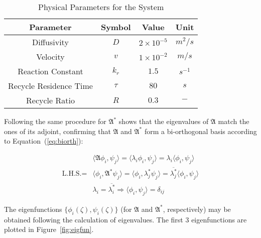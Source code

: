 \begin{table}[ht]
    \centering
    \caption{Physical Parameters for the System}
    \label{tab:pars}
    \begin{tabular}{|c|c|c|c|}
    \hline
    \textbf{Parameter}        & \textbf{Symbol} & \textbf{Value}     & \textbf{Unit}    \\ \hline
    Diffusivity               & $D$             & $2\times10^{-5}$   & ${m^2}/{s}$      \\ \hline
    Velocity                  & $v$             & $1\times10^{-2}$   & ${m}/{s}$        \\ \hline
    Reaction Constant         & $k_r$           & $1.5$              & $s^{-1}$         \\ \hline
    Recycle Residence Time    & $\tau$          & $80$               & $s$              \\ \hline
    Recycle Ratio             & $R$             & $0.3$              & $-$              \\ \hline
    \end{tabular}
\end{table}

Following the same procedure for $\mathfrak{A}^*$ shows that the eigenvalues of $\mathfrak{A}$ match the ones of its adjoint, confirming that $\mathfrak{A}$ and $\mathfrak{A}^*$ form a bi-orthogonal basis according to Equation~(\ref{eq:biorth}):

\begin{equation} \label{eq:biorth}
    \begin{aligned}
        &\langle \mathfrak{A} \phi_i, \psi_j \rangle = \langle \lambda_i \phi_i, \psi_j \rangle = \lambda_i \langle \phi_i, \psi_j \rangle \\
        \text{L.H.S.} = &\langle \phi_i, \mathfrak{A}^* \psi_j \rangle = \langle \phi_i, \lambda_j^* \psi_j \rangle = \overline{\lambda_j^*} \langle \phi_i, \psi_j \rangle \\
        &\lambda_i = \overline{\lambda_i^*} \Rightarrow \langle \phi_i, \psi_j \rangle = \delta_{ij}
    \end{aligned}
\end{equation}

The eigenfunctions $\{ \phi_i(\zeta), \psi_i(\zeta) \}$ (for $\mathfrak{A}$ and $\mathfrak{A}^*$, respectively) may be obtained following the calculation of eigenvalues. The first 3 eigenfunctions are plotted in Figure~\ref{fig:eigfun}. 
